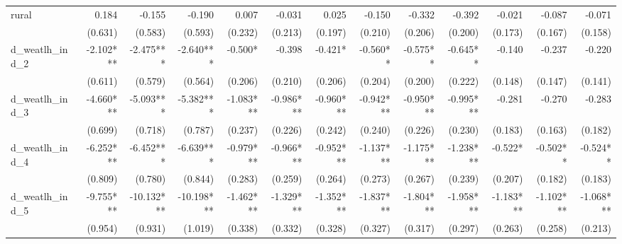 \begin{tabular}{lrrrrrrrrrrrr}
rural                                       &        0.184 &       -0.155 &       -0.190 &        0.007 &       -0.031 &        0.025 &       -0.150 &       -0.332 &       -0.392 &       -0.021 &       -0.087 &       -0.071 \\ 
                                            &      (0.631) &      (0.583) &      (0.593) &      (0.232) &      (0.213) &      (0.197) &      (0.210) &      (0.206) &      (0.200) &      (0.173) &      (0.167) &      (0.158) \\ 
d\_weatlh\_ind\_2                           &    -2.102*** &    -2.475*** &    -2.640*** &      -0.500* &       -0.398 &      -0.421* &     -0.560** &     -0.575** &     -0.645** &       -0.140 &       -0.237 &       -0.220 \\ 
                                            &      (0.611) &      (0.579) &      (0.564) &      (0.206) &      (0.210) &      (0.206) &      (0.204) &      (0.200) &      (0.222) &      (0.148) &      (0.147) &      (0.141) \\ 
d\_weatlh\_ind\_3                           &    -4.660*** &    -5.093*** &    -5.382*** &    -1.083*** &    -0.986*** &    -0.960*** &    -0.942*** &    -0.950*** &    -0.995*** &       -0.281 &       -0.270 &       -0.283 \\ 
                                            &      (0.699) &      (0.718) &      (0.787) &      (0.237) &      (0.226) &      (0.242) &      (0.240) &      (0.226) &      (0.230) &      (0.183) &      (0.163) &      (0.182) \\ 
d\_weatlh\_ind\_4                           &    -6.252*** &    -6.452*** &    -6.639*** &    -0.979*** &    -0.966*** &    -0.952*** &    -1.137*** &    -1.175*** &    -1.238*** &      -0.522* &     -0.502** &     -0.524** \\ 
                                            &      (0.809) &      (0.780) &      (0.844) &      (0.283) &      (0.259) &      (0.264) &      (0.273) &      (0.267) &      (0.239) &      (0.207) &      (0.182) &      (0.183) \\ 
d\_weatlh\_ind\_5                           &    -9.755*** &   -10.132*** &   -10.198*** &    -1.462*** &    -1.329*** &    -1.352*** &    -1.837*** &    -1.804*** &    -1.958*** &    -1.183*** &    -1.102*** &    -1.068*** \\ 
                                            &      (0.954) &      (0.931) &      (1.019) &      (0.338) &      (0.332) &      (0.328) &      (0.327) &      (0.317) &      (0.297) &      (0.263) &      (0.258) &      (0.213) \\ 

\end{tabular}
